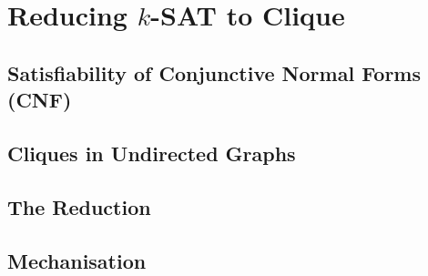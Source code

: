 \chapter{Reducing $k$-SAT to Clique}

\section{Satisfiability of Conjunctive Normal Forms (CNF)}

\section{Cliques in Undirected Graphs}

\section{The Reduction}

\section{Mechanisation}
